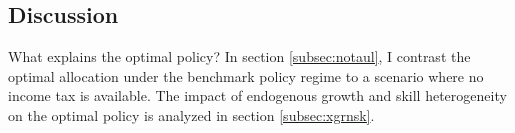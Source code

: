 %




\subsection{Discussion}\label{subsec:dis}

 What explains the optimal policy?
 In section \ref{subsec:notaul}, I contrast the optimal allocation under the benchmark policy regime to a scenario where no income tax is available. The impact of endogenous growth and skill heterogeneity on the optimal policy is analyzed in section \ref{subsec:xgrnsk}.

